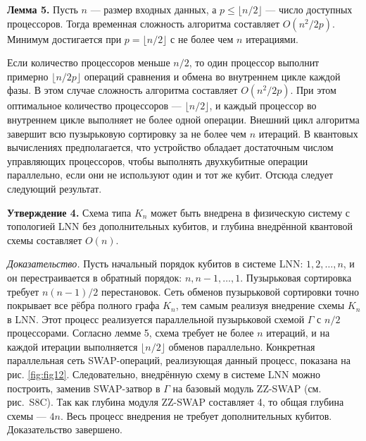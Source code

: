 \textbf{Лемма 5.} Пусть $n$ — размер входных данных, а $p \leq \lfloor n/2
\rfloor$ — число доступных процессоров. Тогда временная сложность алгоритма
составляет $O(n^2 / 2p)$. Минимум достигается при $p = \lfloor n/2 \rfloor$ с
не более чем $n$ итерациями.

Если количество процессоров меньше $n/2$, то один процессор выполнит примерно
$\lfloor n / 2p \rfloor$ операций сравнения и обмена во внутреннем цикле каждой
фазы. В этом случае сложность алгоритма составляет $O(n^2 / 2p)$. При этом
оптимальное количество процессоров — $\lfloor n/2 \rfloor$, и каждый процессор
во внутреннем цикле выполняет не более одной операции. Внешний цикл алгоритма
завершит всю пузырьковую сортировку за не более чем $n$ итераций. В квантовых
вычислениях предполагается, что устройство обладает достаточным числом
управляющих процессоров, чтобы выполнять двухкубитные операции параллельно,
если они не используют один и тот же кубит. Отсюда следует следующий результат.

\textbf{Утверждение 4.} Схема типа $K_n$ может быть внедрена в физическую
систему с топологией LNN без дополнительных кубитов, и глубина внедрённой
квантовой схемы составляет $O(n)$.

\textit{Доказательство.} Пусть начальный порядок кубитов в системе LNN: $1, 2,
\dots, n$, и он перестраивается в обратный порядок: $n, n-1, \dots, 1$.
Пузырьковая сортировка требует $n(n-1)/2$ перестановок. Сеть обменов
пузырьковой сортировки точно покрывает все рёбра полного графа $K_n$, тем самым
реализуя внедрение схемы $K_n$ в LNN. Этот процесс реализуется параллельной
пузырьковой схемой $\Gamma$ с $n/2$ процессорами. Согласно лемме 5, схема
требует не более $n$ итераций, и на каждой итерации выполняется $\lfloor n/2
\rfloor$ обменов параллельно. Конкретная параллельная сеть SWAP-операций,
реализующая данный процесс, показана на рис. \ref{fig:fig12}. Следовательно,
внедрённую схему в системе LNN можно построить, заменив SWAP-затвор в $\Gamma$
на базовый модуль ZZ-SWAP (см. рис.~S8C). Так как глубина модуля ZZ-SWAP
составляет 4, то общая глубина схемы — $4n$. Весь процесс внедрения не требует
дополнительных кубитов. Доказательство завершено.


